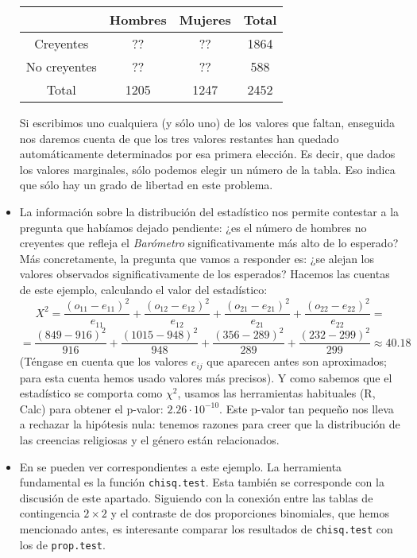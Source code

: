 \begin{itemize}
        \begin{center}
        \begin{tabular}{|c|c|c|c|}
          \hline
           & Hombres & Mujeres & Total \\
           \hline
          Creyentes & ?? & ?? & 1864 \\
          \hline
          No creyentes & ?? & ?? & 588 \\
          \hline
          Total & 1205 & 1247 & 2452 \\
          \hline
        \end{tabular}
        \end{center}
        Si escribimos uno cualquiera (y sólo uno) de los valores que faltan, enseguida nos daremos cuenta de que los tres valores restantes han quedado automáticamente determinados por esa primera elección. Es decir, que dados los valores marginales, sólo podemos elegir un número de la tabla. Eso indica que sólo hay un grado de libertad en este problema.


    \item La información sobre la distribución del estadístico nos permite contestar a la pregunta que habíamos dejado pendiente:  ¿es el número de hombres no creyentes que refleja el {\em Barómetro} significativamente más alto de lo esperado? Más concretamente, la pregunta que vamos a responder es: ¿se alejan los valores observados significativamente de los esperados? Hacemos las cuentas de este ejemplo, calculando el valor del estadístico:
        \[X^2=\dfrac{(o_{11}-e_{11})^2}{e_{11}}+\dfrac{(o_{12}-e_{12})^2}{e_{12}}+\dfrac{(o_{21}-e_{21})^2}{e_{21}}+\dfrac{(o_{22}-e_{22})^2}{e_{22}}=\]
        \[=\dfrac{(849-916)^2}{916}+\dfrac{(1015-948)^2}{948}+\dfrac{(356-289)^2}{289}+\dfrac{(232-299)^2}{299}
            \approx 40.18
        \]
        (Téngase en cuenta que los valores $e_{ij}$ que aparecen antes son aproximados; para esta cuenta hemos usado valores más precisos). Y como sabemos que el estadístico se comporta como $\chi^2$, usamos las herramientas habituales (R, Calc) para obtener el p-valor: $2.26\cdot 10^{-10}$. Este p-valor tan pequeño nos lleva a rechazar la hipótesis nula: tenemos razones para creer que la distribución de las creencias religiosas y el género están relacionados.

    \item En  se pueden ver  correspondientes a este ejemplo. La herramienta fundamental es la función {\tt chisq.test}. Esta  también se corresponde con la discusión de este apartado. Siguiendo con la conexión entre las tablas de contingencia $2\times 2$ y el contraste de dos proporciones binomiales, que hemos mencionado antes, es interesante comparar los resultados de {\tt chisq.test} con los de {\tt prop.test}.


\end{itemize}
